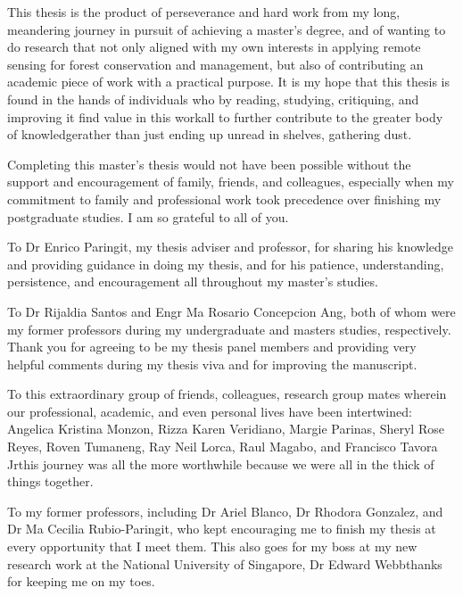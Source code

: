 
This thesis is the product of perseverance and hard work from my long, meandering journey in pursuit of achieving a master’s degree, and of wanting to do research that not only aligned with my own interests in applying remote sensing for forest conservation and management, but also of contributing an academic piece of work with a practical purpose. It is my hope that this thesis is found in the hands of individuals who by reading, studying, critiquing, and improving it find value in this work\textemdash all to further contribute to the greater body of knowledge\textemdash rather than just ending up unread in shelves, gathering dust.

Completing this master’s thesis would not have been possible without the support and encouragement of family, friends, and colleagues, especially when my commitment to family and professional work took precedence over finishing my postgraduate studies. I am so grateful to all of you.

To Dr Enrico Paringit, my thesis adviser and professor, for sharing his knowledge and providing guidance in doing my thesis, and for his patience, understanding, persistence, and encouragement all throughout my master’s studies.

To Dr Rijaldia Santos and Engr Ma Rosario Concepcion Ang, both of whom were my former professors during my undergraduate and masters studies, respectively. Thank you for agreeing to be my thesis panel members and providing very helpful comments during my thesis viva and for improving the manuscript.

To this extraordinary group of friends, colleagues, research group mates wherein our professional, academic, and even personal lives have been intertwined: Angelica Kristina Monzon, Rizza Karen Veridiano, Margie Parinas, Sheryl Rose Reyes, Roven Tumaneng, Ray Neil Lorca, Raul Magabo, and Francisco Tavora Jr\textemdash this journey was all the more worthwhile because we were all in the thick of things together.

To my former professors, including Dr Ariel Blanco, Dr Rhodora Gonzalez, and Dr Ma Cecilia Rubio-Paringit, who kept encouraging me to finish my thesis at every opportunity that I meet them. This also goes for my boss at my new research work at the National University of Singapore, Dr Edward Webb\textemdash thanks for keeping me on my toes.

